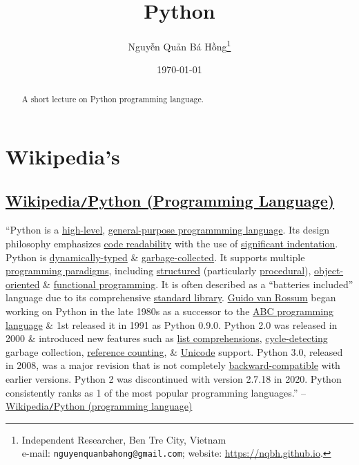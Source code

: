 \documentclass{article}
\title{Python}
\author{\selectlanguage{vietnamese} Nguyễn Quản Bá Hồng\footnote{Independent Researcher, Ben Tre City, Vietnam\\e-mail: \texttt{nguyenquanbahong@gmail.com}; website: \url{https://nqbh.github.io}.}}
\date{\today}
\numberwithin{equation}{section}
\begin{document}
\maketitle
\begin{abstract}
	A short lecture on Python programming language.
\end{abstract}
\setcounter{secnumdepth}{4}
\setcounter{tocdepth}{4}
\tableofcontents


\section{Wikipedia's}

\subsection{\href{https://en.wikipedia.org/wiki/Python_(programming_language)}{Wikipedia\texttt{/}Python (Programming Language)}}
``Python is a \href{https://en.wikipedia.org/wiki/High-level_programming_language}{high-level}, \href{https://en.wikipedia.org/wiki/General-purpose_programming_language}{general-purpose programmming language}. Its design philosophy emphasizes \href{https://en.wikipedia.org/wiki/Code_readability}{code readability} with the use of \href{https://en.wikipedia.org/wiki/Off-side_rule}{significant indentation}. Python is \href{https://en.wikipedia.org/wiki/Type_system#DYNAMIC}{dynamically-typed} \& \href{https://en.wikipedia.org/wiki/Garbage_collection_(computer_science)}{garbage-collected}. It supports multiple \href{https://en.wikipedia.org/wiki/Programming_paradigm}{programming paradigms}, including \href{https://en.wikipedia.org/wiki/Structured_programming}{structured} (particularly \href{https://en.wikipedia.org/wiki/Procedural_programming}{procedural}), \href{https://en.wikipedia.org/wiki/Object-oriented_programming}{object-oriented} \& \href{https://en.wikipedia.org/wiki/Functional_programming}{functional programming}. It is often described as a ``batteries included'' language due to its comprehensive \href{https://en.wikipedia.org/wiki/Standard_library}{standard library}. \href{https://en.wikipedia.org/wiki/Guido_van_Rossum}{Guido van Rossum} began working on Python in the late 1980s as a successor to the \href{https://en.wikipedia.org/wiki/ABC_(programming_language)}{ABC programming language} \& 1st released it in 1991 as Python 0.9.0. Python 2.0 was released in 2000 \& introduced new features such as \href{https://en.wikipedia.org/wiki/List_comprehension}{list comprehensions}, \href{https://en.wikipedia.org/wiki/Cycle_detection}{cycle-detecting} garbage collection, \href{https://en.wikipedia.org/wiki/Reference_counting}{reference counting}, \& \href{https://en.wikipedia.org/wiki/Unicode}{Unicode} support. Python 3.0, released in 2008, was a major revision that is not completely \href{https://en.wikipedia.org/wiki/Backward_compatibility}{backward-compatible} with earlier versions. Python 2 was discontinued with version 2.7.18 in 2020. Python consistently ranks as 1 of the most popular programming languages.'' -- \href{https://en.wikipedia.org/wiki/Python_(programming_language)}{Wikipedia\texttt{/}Python (programming language)}
\end{document}
